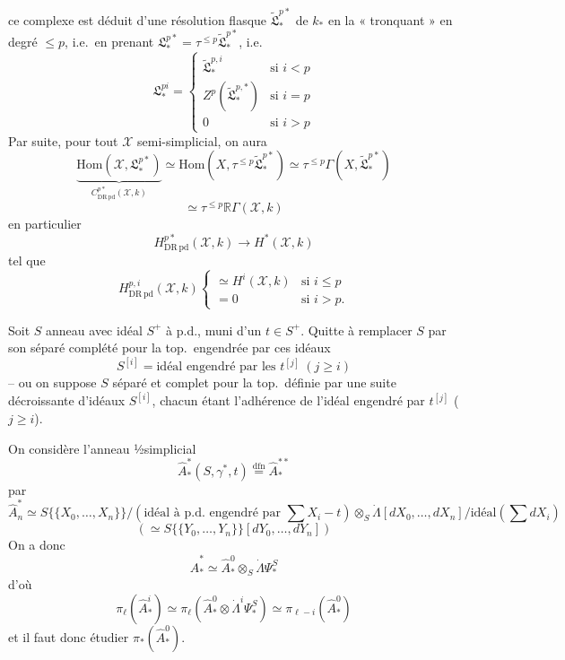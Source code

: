 \documentclass[11pt,a4paper]{article}
\begin{document}
ce complexe est déduit d'une résolution
flasque $\widetilde{\mathfrak{L}}^{p*}_*$ de \struck{\ill{}} $k_*$ en la « tronquant »
en  degré $\leq p$, i.e.\ en prenant $\mathfrak{L}^{p*}_* = \tau^{\leq p}\widetilde{\mathfrak{L}}^{p*}_*$,
\struck{\ill{}} i.e.
\[ \mathfrak{L}^{pi}_* = \begin{cases} \widetilde{\mathfrak{L}}^{p,i}_* & \text{si } i < p \\ Z^p(\widetilde{\mathfrak{L}}^{p,*}_*) & \text{si } i = p \\ 0 & \text{si } i > p \end{cases} \]
Par suite, pour tout $\mathcal{X}$ semi-simplicial, on
aura
\[ \underbrace{\mathrm{Hom}(\mathcal{X}, \mathfrak{L}^{p*}_*)}_{C^{p*}_{\mathrm{DR\,pd}}(\mathcal{X}, k)} \simeq \mathrm{Hom}(X, \tau^{\leq p}\widetilde{\mathfrak{L}}^{p*}_*) \simeq \tau^{\leq p}\Gamma(X, \widetilde{\mathfrak{L}}^{p*}_*) \]
\[ \simeq \tau^{\leq p}\mathbb{R}\Gamma(\mathcal{X}, k) \]
en particulier
\[ H^{p*}_{\mathrm{DR\,pd}}(\mathcal{X}, k) \to H^*(\mathcal{X}, k) \]
 tel que
\[ H^{p,i}_{\mathrm{DR\,pd}}(\mathcal{X}, k) \begin{cases} \simeq H^i(\mathcal{X}, k) & \text{si } i \leq p \\ = 0 & \text{si } i > p . \end{cases} \]

Soit $S$ anneau avec idéal $S^+$ à p.d., muni d'un
 $t \in S^+$. Quitte à remplacer
$S$ par son séparé complété pour la top.\ engendrée
par ces idéaux
\[ S^{[i]} = \text{idéal engendré par les } t^{[j]} \ (j \geq i) \]
-- ou on suppose $S$ séparé et complet pour
la top.\ définie par une suite décroissante
d'idéaux $S^{[i]}$, chacun étant l'adhérence
de l'idéal engendré par $t^{[j]}$ ($j \geq i$).

On considère l'anneau ½simplicial
\[ \widehat{A}^*_*(S, \gamma^*, t) \overset{\mathrm{dfn}}{=} \widehat{A}^{**}_* \]
par
\[ \widehat{A}^*_n \simeq S\{\{X_0, \dots, X_n\}\}/(\text{idéal à p.d.\ engendré par } \textstyle\sum X_i - t) \otimes_S \dot\Lambda[dX_0, \dots, dX_n]/\text{idéal}(\textstyle\sum dX_i) \]
\[ (\simeq S\{\{Y_0, \dots, Y_n\}\}[dY_0, \dots, dY_n]) \]
On a donc
\[ \widehat{A}^*_* \simeq \widehat{A}^0_* \otimes_S \dot\Lambda\Psi^S_* \]
d'où
\[ \pi_\ell(\widehat{A}^i_*) \simeq \pi_\ell(\widehat{A}^0_* \otimes \dot\Lambda^i\Psi^S_*) \simeq \pi_{\ell-i}(\widehat{A}^0_*) \]
et il faut donc étudier $\pi_*(\widehat{A}^0_*)$.
\end{document}
